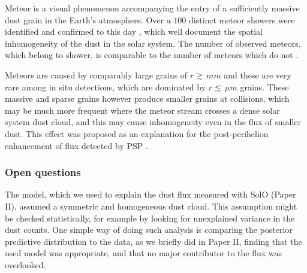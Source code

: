 Meteor is a visual phenomenon accompanying the entry of a sufficiently massive dust grain in the Earth's atmosphere. Over a $100$ distinct meteor showers were identified and confirmed to this day \citep{jenniskens2020removing}, which well document the spatial inhomogeneity of the dust in the solar system. The number of observed meteors, which belong to shower, is comparable to the number of meteors which do not \citep{jenniskens2016cams}. 

Meteors are caused by comparably large grains of $r \gtrsim \, \si{mm}$ and these are very rare among in situ detections, which are dominated by $r \lesssim \, \si{\mu m}$ grains. These massive and sparse grains however produce smaller grains at collisions, which may be much more frequent where the meteor stream crosses a dense solar system dust cloud, and this may cause inhomogeneity even in the flux of smaller dust. This effect was proposed as an explanation for the post-perihelion enhancement of flux detected by PSP \citep{szalay2021collisional}. 

\subsubsection{Open questions}

The model, which we used to explain the dust flux measured with SolO (Paper II), assumed a symmetric and homogeneous dust cloud. This assumption might be checked statistically, for example by looking for unexplained variance in the dust counts. One simple way of doing such analysis is comparing the posterior predictive distribution to the data, as we briefly did in Paper II, finding that the used model was appropriate, and that no major contributor to the flux was overlooked. 






